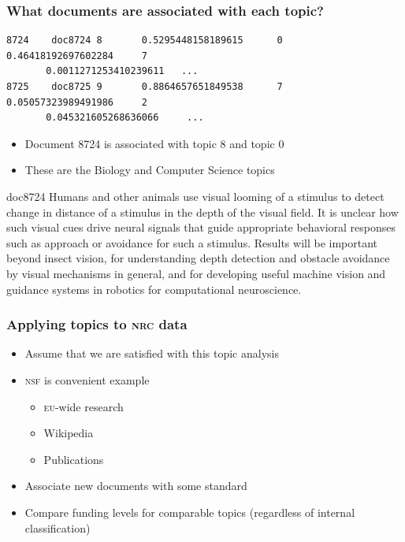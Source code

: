\begin{frame}[fragile]
  \frametitle{What documents are associated with each topic?}

  \begin{lstlisting}
8724    doc8724 8       0.5295448158189615      0       0.46418192697602284     7
       0.0011271253410239611   ...
8725    doc8725 9       0.8864657651849538      7       0.05057323989491986     2
       0.045321605268636066     ...
        \end{lstlisting}

    \begin{itemize}
      \item Document 8724 is associated with topic 8 and topic 0
        \item These are the Biology and Computer Science topics
      \end{itemize}

      \pause

      \vspace{-3cm}

  \begin{block}{doc8724}
    \small
Humans and other animals use visual  looming  of a stimulus to detect change in distance of a stimulus in the depth of the visual field. It is unclear how such visual cues drive neural signals that guide appropriate behavioral responses such as approach or avoidance for such a stimulus. Results will be important beyond insect vision, for understanding depth detection and obstacle avoidance by visual mechanisms in general, and for developing useful machine vision and guidance systems in robotics for computational neuroscience.
  \end{block}

\end{frame}


\begin{frame}
  \frametitle{Applying topics to \textsc{nrc} data}
  \begin{itemize}
    \item Assume that we are satisfied with this topic analysis
    \item \textsc{nsf} is convenient example
      \begin{itemize}
        \item \textsc{eu}-wide research
        \item Wikipedia
        \item Publications
      \end{itemize}
      \item Associate \alert<2>{new documents} with some \alert<3>{standard}
      \item Compare funding levels for comparable topics (regardless of internal classification)
  \end{itemize}

\end{frame}


